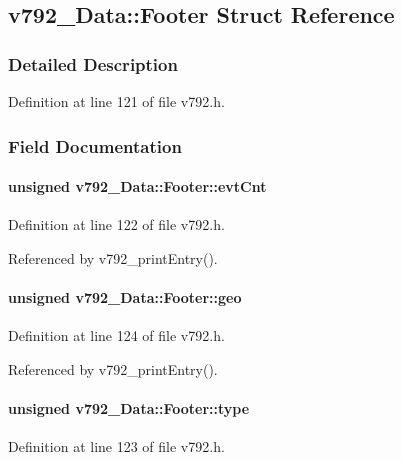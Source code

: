 \subsection{v792\_\-Data::Footer Struct Reference}
\label{structv792__Data_1_1Footer}


\subsubsection{Detailed Description}


Definition at line 121 of file v792.h.

\subsubsection{Field Documentation}
\paragraph[{evtCnt}]{\setlength{\rightskip}{0pt plus 5cm}unsigned {\bf v792\_\-Data::Footer::evtCnt}}\hfill\label{structv792__Data_1_1Footer_aa3624c30803c4a3f0ee46dffcb98d86a}


Definition at line 122 of file v792.h.

Referenced by v792\_\-printEntry().
\paragraph[{geo}]{\setlength{\rightskip}{0pt plus 5cm}unsigned {\bf v792\_\-Data::Footer::geo}}\hfill\label{structv792__Data_1_1Footer_a8e9f5a791f8938e245a533d5571b0eb4}


Definition at line 124 of file v792.h.

Referenced by v792\_\-printEntry().
\paragraph[{type}]{\setlength{\rightskip}{0pt plus 5cm}unsigned {\bf v792\_\-Data::Footer::type}}\hfill\label{structv792__Data_1_1Footer_a5074f51f8fdc9e0034004bd72fa50003}


Definition at line 123 of file v792.h.